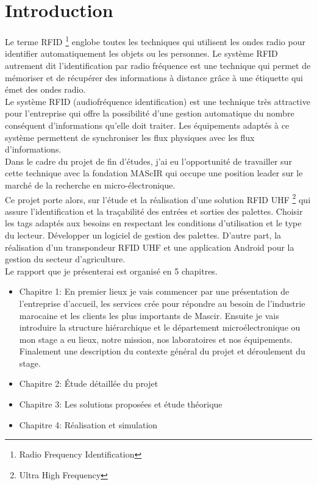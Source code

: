 \documentclass[11pt, a4paper, twoside]{book}
\begin{document}
\listoffigures

\listoftables

\chapter*{Introduction}
Le terme RFID \footnote{Radio Frequency Identification} englobe toutes les techniques qui utilisent les ondes radio pour identifier automatiquement les objets ou les personnes. Le système RFID autrement dit l'identification par radio fréquence est une technique qui permet de mémoriser et de récupérer des informations à distance grâce à une étiquette qui émet des ondes radio.\\

Le système RFID (audiofréquence identification) est une technique très attractive pour l'entreprise qui offre la possibilité d'une gestion automatique du nombre conséquent d'informations qu'elle doit traiter. Les équipements adaptés à ce système permettent de synchroniser les flux physiques avec les flux d'informations.\\

Dans le cadre du projet de fin d'études, j'ai eu l'opportunité de travailler sur cette technique avec la fondation MAScIR qui occupe une position leader sur le marché de la recherche en micro-électronique.\\

Ce projet porte alors, sur l'étude et la réalisation d’une solution RFID UHF \footnote{Ultra High Frequency} qui assure l’identification et la traçabilité des entrées et sorties des palettes. Choisir les tags adaptés aux besoins en respectant les conditions d’utilisation et le type du lecteur. Développer un logiciel de gestion des palettes. D’autre part, la réalisation d’un transpondeur RFID UHF et une application Android pour la gestion du secteur d'agriculture.\\

Le rapport que je présenterai est organisé en 5 chapitres.


\begin{itemize}
\item Chapitre 1: En premier lieux je vais commencer par une présentation de l'entreprise d'accueil, les services crée pour répondre au besoin de l'industrie marocaine et les clients les plus importants de Mascir. Ensuite je vais introduire la structure hiérarchique et le département microélectronique ou mon stage a eu lieux, notre mission, nos laboratoires et nos équipements. Finalement une description du contexte général du projet et déroulement du stage.

\item Chapitre 2: Étude détaillée du projet 
\item Chapitre 3: Les solutions proposées et étude théorique
\item Chapitre 4: Réalisation et simulation
\end{itemize}
\end{document}
